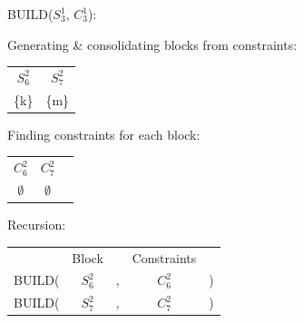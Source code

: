 \documentclass[11pt]{article} %
\begin{document}
	\hspace{0.5cm}BUILD($S_3^1$, $C_3^1$):
		\begin{center}
		Generating \& consolidating blocks from constraints:
		
		\begin{tabular}{c c}
			\hspace{0.8cm}$S_6^2$\hspace{0.8cm} & \hspace{0.8cm}$S_7^2$\hspace{0.8cm} \\
			\{k\} & \{m\}
		\end{tabular}
	
		Finding constraints for each block:
		
		\begin{tabular}{c c c}
			\hspace{0.8cm}$C_6^2$\hspace{0.8cm} & \hspace{0.8cm}$C_7^2$\hspace{0.8cm} \\
			$\emptyset$ & $\emptyset$
		\end{tabular}

		Recursion:
		
		\begin{tabular}{c c c c c}
			 & Block & & Constraints & \\
			BUILD( & $S_6^2$ & , & $C_6^2$ & ) \\
			BUILD( & $S_7^2$ & , & $C_7^2$ & )
		\end{tabular}
		\end{center}


\subsubsection{}
\end{document}
